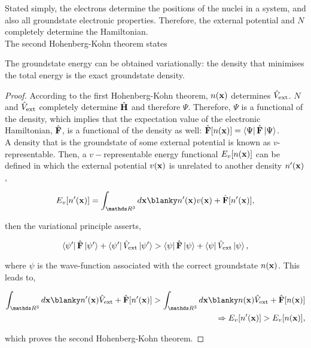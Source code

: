 \documentclass{homework}
\begin{document}
Stated simply, the electrons determine the positions of the nuclei in a system, and also all groundstate electronic properties. Therefore, the external potential and $N$ completely determine the Hamiltonian. \\

The second Hohenberg-Kohn theorem states 

\begin{theo}
\end{theo}
The groundstate energy can be obtained variationally: the density that minimises the total energy is the exact groundstate density. 

\begin{proof}

According to the first Hohenberg-Kohn theorem, $n({\bf x})$ determines $\hat{V}_{\textnormal{ext}}$. $N$ and $\hat{V}_{\textnormal{ext}}$ completely determine $\hat{\bf H}$ and therefore $\Psi$. Therefore, $\Psi$ is a functional of the density, which implies that the expectation value of the electronic Hamiltonian, $\hat{\bf F}$, is a functional of the density as well: $\hat{\bf F} [n({\bf x})] = \bra{\Psi}\hat{\bf F}\ket{\Psi}$. \\

A density that is the groundstate of some external potential is known as $v$-representable. Then, a $v-$representable energy functional $E_{v}[n({\bf x})]$ can be defined in which the external potential $v({\bf x})$ is unrelated to another density $n'({\bf x})$,


\begin{align*}
    E_{v}[n'({\bf x})] = \int_{\R^3} d{\bf x} \blanky n'({\bf x}) v({\bf x}) + \hat{\bf F} [n'({\bf x})],
\end{align*}

then the variational principle asserts,

\begin{equation*}
    \bra{\psi'}\hat{\bf F}\ket{\psi'} + \bra{\psi'}\hat{V}_{\textnormal{ext}}\ket{\psi'} >  \bra{\psi}\hat{\bf F}\ket{\psi} + \bra{\psi}\hat{V}_{\textnormal{ext}}\ket{\psi},
\end{equation*}

where $\psi$ is the wave-function associated with the correct groundstate $n({\bf x})$. This leads to, 

\begin{align*}
     \int_{\R^3} d{\bf x} \blanky n'({\bf x})\hat{V}_{\textnormal{ext}} + \hat{\bf F} [n'({\bf x})] > \int_{\R^3} d{\bf x} \blanky n({\bf x})\hat{V}_{\textnormal{ext}} + \hat{\bf F} [n({\bf x})] \\
     \Rightarrow  E_{v}[n'({\bf x})] >  E_{v}[n({\bf x})],
\end{align*}

which proves the second Hohenberg-Kohn theorem. 

\end{proof}
\end{document}

